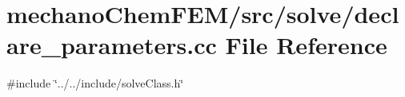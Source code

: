 \section{mechano\+Chem\+F\+E\+M/src/solve/declare\+\_\+parameters.cc File Reference}
\label{solve_2declare__parameters_8cc}
{\ttfamily \#include \char`\"{}../../include/solve\+Class.\+h\char`\"{}}\newline
